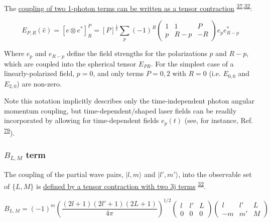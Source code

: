\documentclass[10pt]{article}
\begin{document}
The
\href{https://epsproc.readthedocs.io/en/latest/methods/geometric_method_dev_260220_090420_tidy.html\#E_\%7BP,R\%7D-tensor}{coupling
of two 1-photon terms can be written as a tensor contraction} \textsuperscript{\hyperref[csl:37]{37},\hyperref[csl:32]{32}}:

\begin{equation}
E_{P,R}(\hat{e})=[e\otimes e^{*}]_{R}^{P}=[P]^{\frac{1}{2}}\sum_{p}(-1)^{R}\left(\begin{array}{ccc}
1 & 1 & P\\
p & R-p & -R
\end{array}\right)e_{p}e_{R-p}^{*}
\label{eq:EPR-defn-1}
\end{equation}

Where \(e_{p}\) and \(e_{R-p}\) define the field strengths for the
polarizations \(p\) and \(R-p\), which are coupled into the spherical
tensor \(E_{PR}\). For the simplest case of a linearly-polarized field, $p=0$, and only terms $P=0,2$ with $R=0$ (i.e. $E_{0,0}$ and $E_{2,0}$) are non-zero.

Note this notation implicitly describes only the time-independent photon angular momentum coupling,
but time-dependent/shaped laser fields can be readily incorporated by allowing for time-dependent fields $e_{p}(t)$ (see, for instance, Ref. \textsuperscript{\hyperref[csl:79]{79}}).

\subsubsection{\texorpdfstring{\(B_{L,M}\)
term}{B\_\{L,M\} term}}\label{b_lm-term}

The coupling of the partial wave pairs, \(|l,m\rangle\) and
\(|l',m'\rangle\), into the observable set of \(\{L,M\}\) is
\href{https://epsproc.readthedocs.io/en/latest/methods/geometric_method_dev_260220_090420_tidy.html\#B_\%7BL,M\%7D-term}{defined
by a tensor contraction with two 3j terms} \textsuperscript{\hyperref[csl:32]{32}}.

\begin{equation}
B_{L,M}=(-1)^{m}\left(\frac{(2l+1)(2l'+1)(2L+1)}{4\pi}\right)^{1/2}\left(\begin{array}{ccc}
l & l' & L\\
0 & 0 & 0
\end{array}\right)\left(\begin{array}{ccc}
l & l' & L\\
-m & m' & M
\end{array}\right)
\label{eq:BLM-func-defn}
\end{equation}
\end{document}
